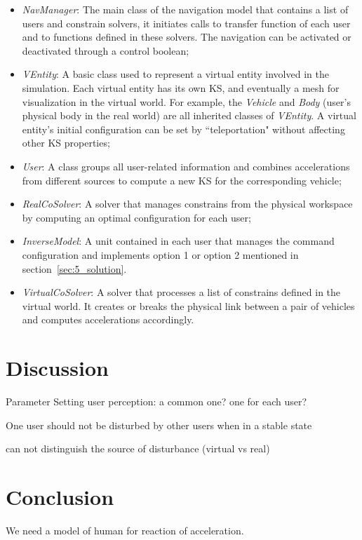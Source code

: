 \begin{itemize}
\item \textit{NavManager}: The main class of the navigation model that contains a list of users and constrain solvers, it initiates calls to transfer function of each user and to functions defined in these solvers. The navigation can be activated or deactivated through a control boolean;
\item \textit{VEntity}: A basic class used to represent a virtual entity involved in the simulation. Each virtual entity has its own KS, and eventually a mesh for visualization in the virtual world. For example, the \textit{Vehicle} and \textit{Body} (user's physical body in the real world) are all inherited classes of \textit{VEntity}. A virtual entity's initial configuration can be set by ``teleportation" without affecting other KS properties;
\item \textit{User}: A class groups all user-related information and combines accelerations from different sources to compute a new KS for the corresponding vehicle;
\item \textit{RealCoSolver}: A solver that manages constrains from the physical workspace by computing an optimal configuration for each user;
\item \textit{InverseModel}: A unit contained in each user that manages the command configuration and implements option 1 or option 2 mentioned in section~\ref{sec:5_solution}.
\item \textit{VirtualCoSolver}: A solver that processes a list of constrains defined in the virtual world. It creates or breaks the physical link between a pair of vehicles and computes accelerations accordingly. 
\end{itemize}


\section{Discussion}
Parameter Setting user perception: a common one? one for each user?

One user should not be disturbed by other users when in a stable state

can not distinguish the source of disturbance (virtual vs real)


\section{Conclusion}
We need a model of human for reaction of acceleration.